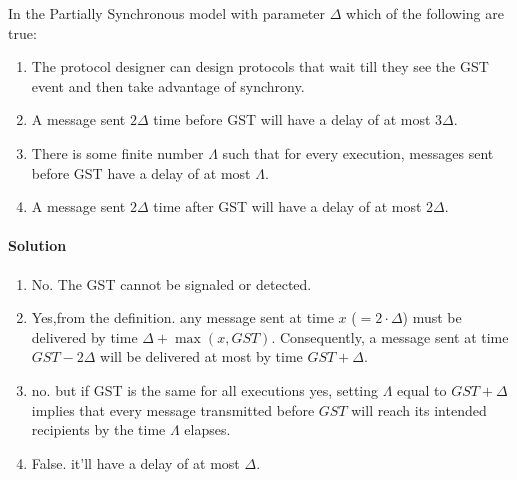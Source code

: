 \begin{xca}[Quiz 1.C]
    In the Partially Synchronous model with parameter $\Delta$ which of the following are true:
    \begin{enumerate}
        \item The protocol designer can design protocols that wait till they 
        see the GST event and then take advantage of synchrony.
        \item A message sent $2\Delta$ time before GST will have a delay of at most $3\Delta$.
        \item There is some finite number $\Lambda$ such that for every
         execution, messages sent before GST have a delay of at most $\Lambda$.
         \item A message sent $2\Delta$ time after GST will have a delay of at most $2\Delta$.
    \end{enumerate}
    
    \paragraph{Solution}
    \begin{enumerate}
        \item No. The GST cannot be signaled or detected.
        \item Yes,from the definition. any message sent at time $x$ ($=2\cdot \Delta$) must be delivered by
         time $\Delta + \max(x, GST)$. 
         Consequently, a message sent at time $GST - 2\Delta$ will be delivered at most by time $GST + \Delta$.
        \item no. but if GST is the same for all executions yes, setting $\Lambda$ equal to $GST + \Delta$ implies 
        that every message transmitted before $GST$ will reach its intended recipients by the time $\Lambda$ elapses.
        \item False. it'll have a delay of at most $\Delta$.
    \end{enumerate}
\end{xca}


